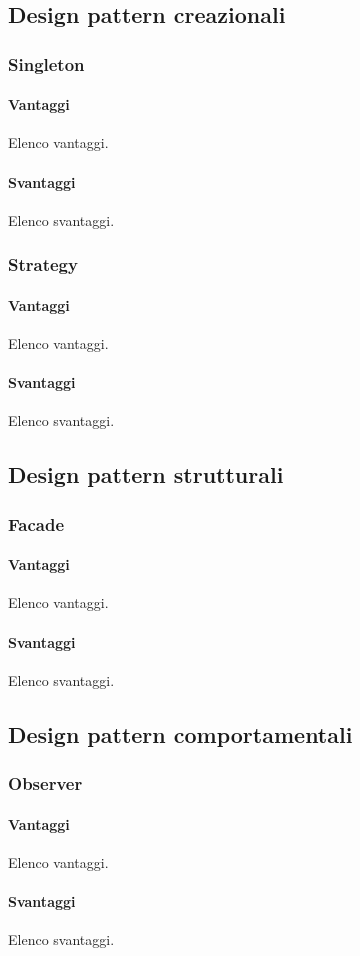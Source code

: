 \documentclass[../SpecificaTecnica.tex]{subfiles}
\begin{document}
	\subsection{Design pattern creazionali}
		\subsubsection{Singleton}
		
			\paragraph{Vantaggi}
				Elenco vantaggi.
			\paragraph{Svantaggi}
				Elenco svantaggi.
		\subsubsection{Strategy}
		
			\paragraph{Vantaggi}
				Elenco vantaggi.
			\paragraph{Svantaggi}
				Elenco svantaggi.
	\subsection{Design pattern strutturali}
		\subsubsection{Facade}
		
			\paragraph{Vantaggi}
				Elenco vantaggi.
			\paragraph{Svantaggi}
				Elenco svantaggi.
	\subsection{Design pattern comportamentali}
		\subsubsection{Observer}
		
			\paragraph{Vantaggi}
				Elenco vantaggi.
			\paragraph{Svantaggi}
				Elenco svantaggi.
\end{document}
